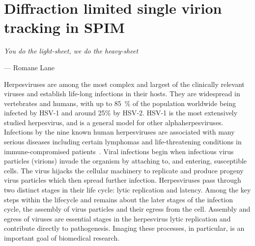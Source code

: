 \ifpdf
    \graphicspath{{Chapters/spt/Figs/Raster/}{Chapters/spt/Figs/PDF/}{Chapters/spt/Figs/}}
\else
    \graphicspath{{Chapters/spt/Figs/Vector/}{Chapters/spt/Figs/}}
\fi

\chapter{Diffraction limited single virion tracking in SPIM}\label{chapter:spt}

\epigraph{\emph{You do the light-sheet, we do the heavy-sheet}}{--- Romane Lane}

Herpesviruses are among the most complex and largest of the clinically relevant viruses and establish life-long infections in their hosts.
They are widespread in vertebrates and humans, with up to \SI{85}{\percent} of the population worldwide being infected by \gls{HSV}-1 and around 25\% by \gls{HSV}-2.
\gls{HSV}-1 is the most extensively studied herpesvirus, and is a general model for other alphaherpesviruses.
Infections by the nine known human herpesviruses are associated with many serious diseases including certain lymphomas and life-threatening conditions in immune-compromised patients~\cite{[1]}.
Viral infections begin when infectious virus particles (\gls{virion}s) invade the organism by attaching to, and entering, susceptible cells.
The virus hijacks the cellular machinery to replicate and produce progeny virus particles which then spread further infection.
Herpesviruses pass through two distinct stages in their life cycle: lytic replication and latency.
Among the key steps within the lifecycle and remains about the later
stages of the infection cycle, the assembly of virus particles and their egress from the cell.
Assembly and egress of viruses are essential stages in the herpesvirus lytic replication and contribute directly to pathogenesis.
Imaging these processes, in particular, is an important goal of biomedical research.

